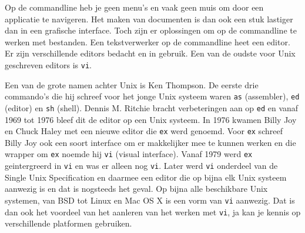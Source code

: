 Op de commandline heb je geen menu's en vaak geen muis om door een applicatie te navigeren. Het maken van documenten is dan ook een stuk lastiger dan in een grafische interface. Toch zijn er oplossingen om op de commandline te werken met bestanden. Een tekstverwerker op de commandline heet een editor. Er zijn verschillende editors bedacht en in gebruik. Een van de oudste voor Unix geschreven editors is \texttt{vi}.

Een van de grote namen achter Unix is Ken Thompson. De eerste drie commando's die hij schreef voor het jonge Unix systeem waren \texttt{as} (assembler), \texttt{ed} (editor) en \texttt{sh} (shell). Dennis M. Ritchie bracht verbeteringen aan op \texttt{ed} en vanaf 1969 tot 1976 bleef dit de editor op een Unix systeem. In 1976 kwamen Billy Joy en Chuck Haley met een nieuwe editor die \texttt{ex} werd genoemd. Voor \texttt{ex} schreef Billy Joy ook een soort interface om er makkelijker mee te kunnen werken en die wrapper om \texttt{ex} noemde hij \texttt{vi} (visual interface). Vanaf 1979 werd \texttt{ex} geintergreerd in \texttt{vi} en was er alleen nog \texttt{vi}. Later werd \texttt{vi} onderdeel van de Single Unix Specification en daarmee een editor die op bijna elk Unix systeem aanwezig is en dat is nogsteeds het geval. Op bijna alle beschikbare Unix systemen, van BSD tot Linux en Mac OS X is een vorm van \texttt{vi} aanwezig. Dat is dan ook het voordeel van het aanleren van het werken met \texttt{vi}, ja kan je kennis op verschillende platformen gebruiken.
